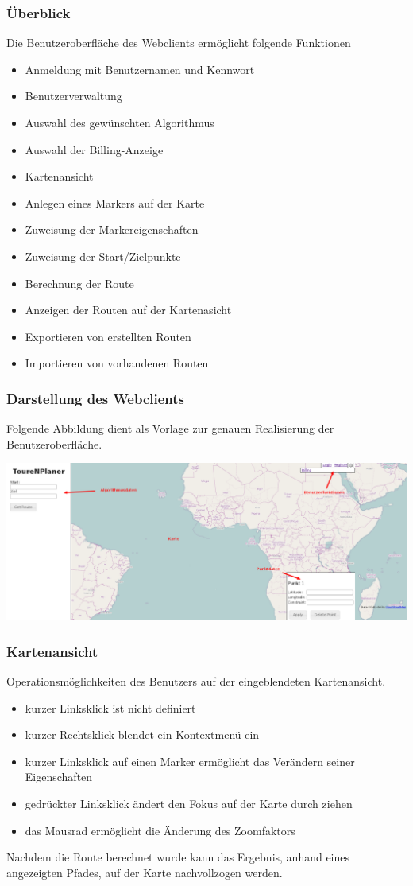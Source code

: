 \documentclass[a4paper,10pt,titlepage]{article}
\begin{document}
\subsubsection{Überblick}
Die Benutzeroberfläche des Webclients ermöglicht folgende Funktionen
\begin{itemize}
\item Anmeldung mit Benutzernamen und Kennwort
\item Benutzerverwaltung
\item Auswahl des gewünschten Algorithmus
\item Auswahl der Billing-Anzeige 
\item Kartenansicht
\item Anlegen eines Markers auf der Karte
\item Zuweisung der Markereigenschaften
\item Zuweisung der Start/Zielpunkte
\item Berechnung der Route
\item Anzeigen der Routen auf der Kartenasicht
\item Exportieren von erstellten Routen
\item Importieren von vorhandenen Routen
\end{itemize}

\subsubsection{Darstellung des Webclients}
Folgende Abbildung dient als Vorlage zur genauen Realisierung der Benutzeroberfläche.

\includegraphics[scale=0.30]{media/web/Index.png} 

\subsubsection{Kartenansicht}
Operationsmöglichkeiten des Benutzers auf der eingeblendeten Kartenansicht.
\begin {itemize}
\item kurzer Linksklick ist nicht definiert
\item kurzer Rechtsklick blendet ein Kontextmenü ein
\item kurzer Linksklick auf einen Marker ermöglicht das Verändern seiner Eigenschaften
\item gedrückter Linksklick ändert den Fokus auf der Karte durch ziehen
\item das Mausrad ermöglicht die Änderung des Zoomfaktors
\end {itemize}
Nachdem die Route berechnet wurde kann das Ergebnis, anhand eines angezeigten Pfades, auf der Karte nachvollzogen werden.
\end{document}
